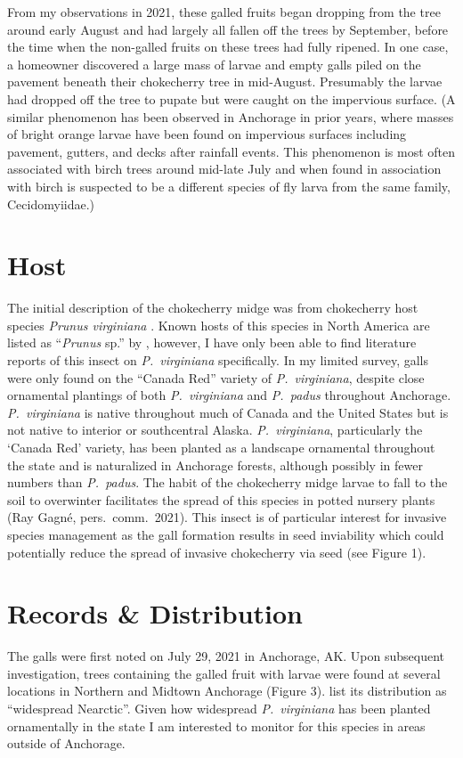 From my observations in 2021, these galled fruits began dropping from the tree around early August and had largely all fallen off the trees by September, before the time when the non-galled fruits on these trees had fully ripened. In one case, a homeowner discovered a large mass of larvae and empty galls piled on the pavement beneath their chokecherry tree in mid-August. Presumably the larvae had dropped off the tree to pupate but were caught on the impervious surface. (A similar phenomenon has been observed in Anchorage in prior years, where masses of bright orange larvae have been found on impervious surfaces including pavement, gutters, and decks after rainfall events. This phenomenon is most often associated with birch trees around mid-late July and when found in association with birch is suspected to be a different species of fly larva from the same family, Cecidomyiidae.)

\section{Host}
 The initial description of the chokecherry midge was from chokecherry host species \textit{Prunus virginiana} \citep{Felt1906}. Known hosts of this species in North America are listed as ``\textit{Prunus} sp.'' by \citet{GagneJaschhof2021}, however, I have only been able to find literature reports of this insect on \textit{P.\ virginiana} specifically. In my limited survey, galls were only found on the ``Canada Red'' variety of \textit{P.\ virginiana}, despite close ornamental plantings of both \textit{P.\ virginiana} and \textit{P.\ padus} throughout Anchorage. \textit{P.\ virginiana} is native throughout much of Canada and the United States but is not native to interior or southcentral Alaska. \textit{P.\ virginiana}, particularly the `Canada Red' variety, has been planted as a landscape ornamental throughout the state and is naturalized in Anchorage forests, although possibly in fewer numbers than \textit{P.\ padus}. The habit of the chokecherry midge larvae to fall to the soil to overwinter facilitates the spread of this species in potted nursery plants (Ray Gagn\'{e}, pers.\ comm.\ 2021). This insect is of particular interest for invasive species management as the gall formation results in seed inviability which could potentially reduce the spread of invasive chokecherry via seed (see Figure 1).
 
\section{Records \& Distribution} The galls were first noted on July 29, 2021 in Anchorage, AK. Upon subsequent investigation, trees containing the galled fruit with larvae were found at several locations in Northern and Midtown Anchorage (Figure 3). \citet{GagneJaschhof2021} list its distribution as ``widespread Nearctic''. Given how widespread \textit{P.\ virginiana} has been planted ornamentally in the state I am interested to monitor for this species in areas outside of Anchorage. 

